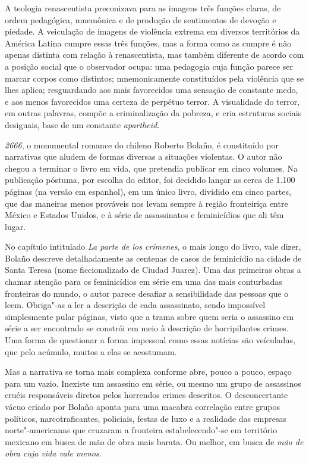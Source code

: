 A teologia renascentista preconizava para as imagens três funções
claras, de ordem pedagógica, mnemônica e de produção de sentimentos de
devoção e piedade. A veiculação de imagens de violência extrema em
diversos territórios da América Latina cumpre essas três funções, mas
a forma como as cumpre é não apenas distinta com relação à
renascentista, mas também diferente de acordo com a posição
social que o observador ocupa: uma pedagogia cuja função parece ser
marcar corpos como distintos; mnemonicamente constituídos pela violência
que se lhes aplica; resguardando aos mais favorecidos uma sensação de
constante medo, e aos menos favorecidos uma certeza de perpétuo terror.
A visualidade do terror, em outras palavras, compõe a criminalização da
pobreza, e cria estruturas sociais desiguais, base de um constante \emph{apartheid}.

\asterisc

\emph{2666}, o monumental romance do chileno Roberto Bolaño, é
constituído por narrativas que aludem de formas diversas a situações
violentas. O autor não chegou a terminar o livro em vida, que pretendia
publicar em cinco volumes. Na publicação póstuma, por escolha do editor,
foi decidido lançar as cerca de 1.100 páginas (na versão em espanhol),
em um único livro, dividido em cinco partes, que das maneiras menos
prováveis nos levam sempre à região fronteiriça entre México e Estados
Unidos, e à série de assassinatos e feminicídios que ali têm lugar.

No capítulo intitulado \emph{La parte de los crímenes}, o mais longo do
livro, vale dizer, Bolaño descreve detalhadamente as centenas de casos
de feminicídio na cidade de Santa Teresa (nome ficcionalizado de Ciudad
Juarez). Uma das primeiras obras a chamar atenção para os feminicídios
em série em uma das mais conturbadas fronteiras do mundo, o autor parece
desafiar a sensibilidade das pessoas que o leem. Obriga"-as a ler a
descrição de cada assassinato, sendo impossível simplesmente pular
páginas, visto que a trama sobre quem seria o assassino em série a ser
encontrado se constrói em meio à descrição de horripilantes crimes. Uma
forma de questionar a forma impessoal como essas notícias são
veículadas, que pelo acúmulo, muitos a elas se acostumam.

Mas a narrativa se torna mais complexa conforme abre, pouco a pouco,
espaço para um vazio. Inexiste um assassino em série, ou mesmo um grupo
de assassinos cruéis responsáveis diretos pelos horrendos crimes
descritos. O desconcertante vácuo criado por Bolaño aponta para uma
macabra correlação entre grupos políticos, narcotraficantes, policiais,
festas de luxo e a realidade das empresas norte"-americanas que cruzaram
a fronteira estabelecendo"-se em território mexicano em busca de mão de obra
mais barata. Ou melhor, em busca de \emph{mão de obra cuja vida vale
menos}.

